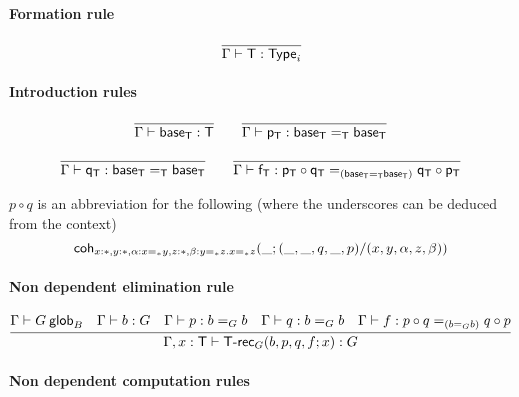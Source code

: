 \paragraph{Formation rule}

\begin{small}
  \[
  \infer{\wftype\Gamma{\dsd{T}}}{}
  \]
\end{small}

\paragraph{Introduction rules}

\begin{small}
  \[
  \begin{array}{c}
    \infer{\ofglob{\Gamma}{\baseT}{\dsd{T}}}{}
    \qquad
    \infer{\ofglob{\Gamma}{\pT}{\homj{\dsd{T}}{\baseT}{\baseT}}}{}
    \\\\
    \infer{\ofglob{\Gamma}{\qT}{\homj{\dsd{T}}{\baseT}{\baseT}}}{}
    \qquad
    \infer{\ofglob{\Gamma}{\fT}{\homj{(\homj{\dsd{T}}{\baseT}{\baseT})}
        {\pT\circ\qT}{\qT\circ\pT}}}{}
  \end{array}
  \]
\end{small}

$p\circ q$ is an abbreviation for the following (where the underscores can be
deduced from the context)
\[\mathsf{coh}_{x:\mathord{*},y:\mathord{*},\alpha:x =_{\mathord{*}} y,z:\mathord{*},
  \beta:y =_{\mathord{*}} z.x =_{\mathord{*}} z} ({\_};{(\_,\_,q,\_,p)/(x,y,\alpha,z,\beta)})\]

\paragraph{Non dependent elimination rule}

\begin{small}
  \[
  \infer{\ofglob{\Gamma,x:\dsd{T}}{\dsd{T\text{-}rec}_G(b, p, q, f; x)}{G}}
  {\wfglob{\Gamma}{G}{B} & \ofglob{\Gamma}{b}{G} &
    \ofglob{\Gamma}{p}{\homj{G}{b}{b}} & \ofglob{\Gamma}{q}{\homj{G}{b}{b}} &
    \ofglob{\Gamma}{f}{\homj{(\homj{G}{b}{b})}{p\circ q}{q \circ p}}}
  \]
\end{small}

\paragraph{Non dependent computation rules}

